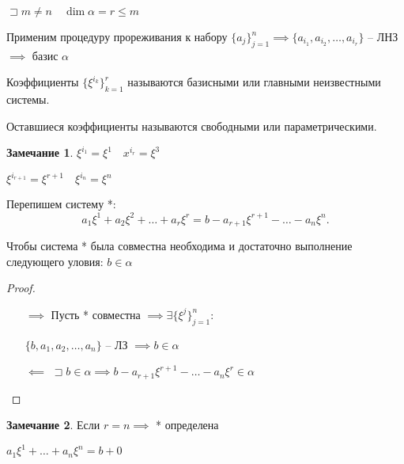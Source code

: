 \documentclass{book}
\theoremstyle{definition}
\newtheorem*{note}{Замечание}
\begin{document}
\begin{enumerate}
        $\sqsupset m\neq n\quad \dim\mathscr{\alpha} = r \leqslant m$

        Применим процедуру прореживания к набору $\{a_j\}_{j=1}^n \implies \{a_{i_1}, a_{i_2}, \ldots, a_{i_r}\}$ -- ЛНЗ $\implies $ базис $\mathscr{\alpha}$

        \begin{definition}
            Коэффициенты $\{\xi^{i_k}\}_{k=1}^r$ называются базисными или главными неизвестными системы.
 
            Оставшиеся коэффициенты называются свободными или параметрическими.
        \end{definition}

        \begin{note}
            $\xi^{i_1} = \xi^1\quad x^{i_r} = \xi^3$

            $\xi^{i_{r+1}} = \xi^{r+1}\quad \xi^{i_n} = \xi^n$
        \end{note}

        Перепишем систему *:
        \[
            a_1\xi^1 + a_2\xi^2 + \ldots + a_r\xi^r = b - a_{r+1}\xi^{r+1} - \ldots - a_n\xi^n
        .\] 

        \begin{theorem}
            Чтобы система * была совместна необходима и достаточно выполнение следующего уловия: $b\in\mathscr{\alpha}$

        \end{theorem}
        \begin{proof}
             \begin{itemize}
                 \item []
                 \item [$\implies $] Пусть * совместна  $\implies \exists \{\xi^j\}_{j=1}^n$:

                     $\{b, a_1, a_2, \ldots, a_n\}$ -- ЛЗ $\implies b\in\mathscr{\alpha}$
                 \item [$\impliedby $] $\sqsupset b\in \mathscr{\alpha} \implies b-a_{r+1}\xi^{r+1} - \ldots - a_n\xi^r\in\mathscr{\alpha}$
            \end{itemize}
        \end{proof}

        \begin{note}
            Если $r = n \implies $ * определена

            $a_1\xi^1 + \ldots + a_n\xi^n = b+0$


\end{note}
\end{enumerate}
\end{document}
